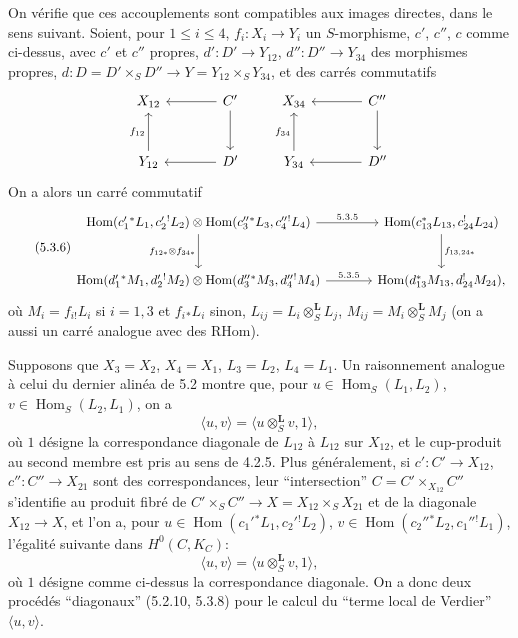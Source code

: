 \documentclass[11pt]{article}
\DeclareMathOperator{\Hom}{Hom}
\providecommand{\RHom}{\mathrm{RHom}}
\providecommand{\RHom}{\mathrm{RHom}}
\providecommand{\Hom}{\operatorname{Hom}}
\providecommand{\RHom}{\mathrm R\mathcal{H}om}
\providecommand{\RHom}{\mathrm{RHom}}
\providecommand{\Hom}{\operatorname{Hom}}
\begin{document}
On vérifie que ces accouplements sont compatibles aux images directes, dans le sens suivant. Soient, pour $1\leq i\leq4$, $f_i:X_i\to Y_i$ un $S$-morphisme, $c'$, $c''$, $c$ comme ci-dessus, avec $c'$ et $c''$ propres, $d':D'\to Y_{12}$, $d'':D''\to Y_{34}$ des morphismes propres, $d:D=D'\times_SD''\to Y=Y_{12}\times_SY_{34}$, et des carrés commutatifs
\[
\begin{tikzcd}[column sep=large,row sep=large]
X_{12} & C' \arrow[l] \arrow[d] \\
Y_{12} \arrow[u,"f_{12}"] & D' \arrow[l]
\end{tikzcd}
\qquad
\begin{tikzcd}[column sep=large,row sep=large]
X_{34} & C'' \arrow[l] \arrow[d] \\
Y_{34} \arrow[u,"f_{34}"] & D'' \arrow[l]
\end{tikzcd}
\]
On a alors un carré commutatif
\begin{equation}
\tag{5.3.6}
\begin{tikzcd}[column sep=large,row sep=large]
\Hom(c_1'{}^*L_1,c_2'{}^!L_2)\otimes\Hom(c_3''{}^*L_3,c_4''{}^!L_4) \arrow[r,"5.3.5"] \arrow[d,"f_{12*}\otimes f_{34*}"']
& \Hom(c_{13}^*L_{13},c_{24}^!L_{24}) \arrow[d,"f_{13,24*}"] \\
\Hom(d_1'{}^*M_1,d_2'{}^!M_2)\otimes\Hom(d_3''{}^*M_3,d_4''{}^!M_4) \arrow[r,"5.3.5"]
& \Hom(d_{13}^*M_{13},d_{24}^!M_{24}),
\end{tikzcd}
\end{equation}
où $M_i=f_{i!}L_i$ si $i=1,3$ et $f_i{}_*L_i$ sinon, $L_{ij}=L_i\otimes_S^{\mathbf L}L_j$, $M_{ij}=M_i\otimes_S^{\mathbf L}M_j$ (on a aussi un carré analogue avec des $\RHom$).

Supposons que $X_3=X_2$, $X_4=X_1$, $L_3=L_2$, $L_4=L_1$. Un raisonnement analogue à celui du dernier alinéa de 5.2 montre que, pour $u\in\Hom_S(L_1,L_2)$, $v\in\Hom_S(L_2,L_1)$, on a
\begin{equation}
\tag{5.3.7}
\langle u,v\rangle=\langle u\otimes_S^{\mathbf L}v,1\rangle,
\end{equation}
où $1$ désigne la correspondance diagonale de $L_{12}$ à $L_{12}$ sur $X_{12}$, et le cup-produit au second membre est pris au sens de 4.2.5. Plus généralement, si $c':C'\to X_{12}$, $c'':C''\to X_{21}$ sont des correspondances, leur ``intersection'' $C=C'\times_{X_{12}}C''$ s'identifie au produit fibré de $C'\times_SC''\to X=X_{12}\times_SX_{21}$ et de la diagonale $X_{12}\to X$, et l'on a, pour $u\in\Hom(c_1'{}^*L_1,c_2'{}^!L_2)$, $v\in\Hom(c_2''{}^*L_2,c_1''{}^!L_1)$, l'égalité suivante dans $H^0(C,K_C)$:
\begin{equation}
\tag{5.3.8}
\langle u,v\rangle=\langle u\otimes_S^{\mathbf L}v,1\rangle,
\end{equation}
où $1$ désigne comme ci-dessus la correspondance diagonale. On a donc deux procédés ``diagonaux'' (5.2.10, 5.3.8) pour le calcul du ``terme local de Verdier'' $\langle u,v\rangle$.
\end{document}
